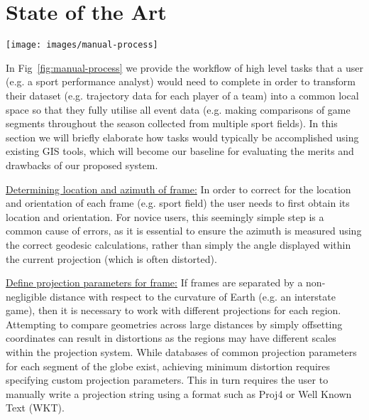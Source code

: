 \section{State of the Art}



\begin{figure*}
\texttt{[image: images/manual-process]}
\caption{Tasks required to split traces (e.g. player GPS trajectories) that span multiple events (e.g. game segments), and reproject relative to frame (e.g. sport field) such that event traces can be compared within a common local coordinate system. Our proposed solution allow tasks marked with a green check to be fully automated, and tasks with a yellow tilde to be semi-automated.}
\label{fig:manual-process}
\end{figure*}

In Fig~\ref{fig:manual-process} we provide the workflow of high level tasks that a user (e.g. a sport performance analyst) would need to complete in order to transform their dataset (e.g. trajectory data for each player of a team) into a common local space so that they fully utilise all event data (e.g. making comparisons of game segments throughout the season collected from multiple sport fields). In this section we will briefly elaborate how tasks would typically be accomplished using existing GIS tools, which will become our baseline for evaluating the merits and drawbacks of our proposed system.

\ul{Determining location and azimuth of frame:} In order to correct for the location and orientation of each frame (e.g. sport field) the user needs to first obtain its location and orientation. For novice users, this seemingly simple step is a common cause of errors, as it is essential to ensure the azimuth is measured using the correct geodesic calculations, rather than simply the angle displayed within the current projection (which is often distorted).

\ul{Define projection parameters for frame:} If frames are separated by a non-negligible distance with respect to the curvature of Earth (e.g. an interstate game), then it is necessary to work with different projections for each region. Attempting to compare geometries across large distances by simply offsetting coordinates can result in distortions as the regions may have different scales within the projection system. While databases of common projection parameters for each segment of the globe exist, achieving minimum distortion requires specifying custom projection parameters. This in turn requires the user to manually write a projection string using a format such as Proj4 or Well Known Text (WKT).


